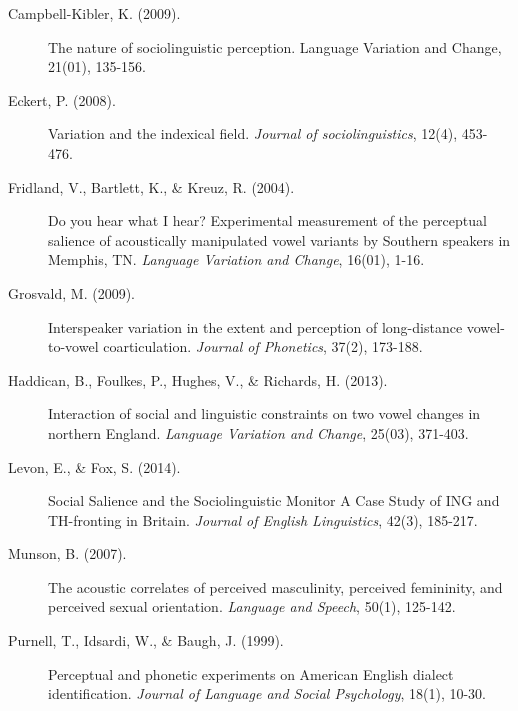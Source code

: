 \documentclass[a0,final]{a0poster}
\begin{document}
\begin{multicols}{4}
\begin{description}
\item[Campbell-Kibler, K. (2009).]{The nature of sociolinguistic perception. Language Variation and Change, 21(01), 135-156.}

\item[Eckert, P. (2008).]{Variation and the indexical field. \textit{Journal of sociolinguistics}, 12(4), 453-476.}\vspace*{0.2cm}

\item[Fridland, V., Bartlett, K., \& Kreuz, R. (2004).]{Do you hear what I hear? Experimental measurement of the perceptual salience of acoustically manipulated vowel variants by Southern speakers in Memphis, TN. \textit{Language Variation and Change}, 16(01), 1-16.}\vspace*{0.2cm}

\item[Grosvald, M. (2009).]{Interspeaker variation in the extent and perception of long-distance vowel-to-vowel coarticulation. \textit{Journal of Phonetics}, 37(2), 173-188.}

\item[Haddican, B., Foulkes, P., Hughes, V., \& Richards, H. (2013).]{Interaction of social and linguistic constraints on two vowel changes in northern England. \textit{Language Variation and Change}, 25(03), 371-403.}

\item[Levon, E., \& Fox, S. (2014).]{ Social Salience and the Sociolinguistic Monitor A Case Study of ING and TH-fronting in Britain. \textit{Journal of English Linguistics}, 42(3), 185-217.}

\item[Munson, B. (2007).]{The acoustic correlates of perceived masculinity, perceived femininity, and perceived sexual orientation. \textit{Language and Speech}, 50(1), 125-142.}

\item[Purnell, T., Idsardi, W., \& Baugh, J. (1999).]{ Perceptual and phonetic experiments on American English dialect identification. \textit{Journal of Language and Social Psychology}, 18(1), 10-30.}


\end{description}
%
%

\end{multicols}
\end{document}
